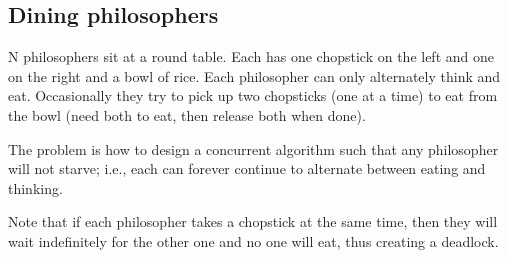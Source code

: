 

\subsection{Dining philosophers}
N philosophers sit at a round table. Each has one chopstick on the left and one on the right and a bowl of rice. Each philosopher can only alternately think and eat. Occasionally they try to pick up two chopsticks (one at a time) to eat from the bowl (need both to eat, then release both when done). 

The problem is how to design a concurrent algorithm such that any philosopher will not starve; i.e., each can forever continue to alternate between eating and thinking.

Note that if each philosopher takes a chopstick at the same time, then they will wait indefinitely for the other one and no one will eat, thus creating a deadlock.


